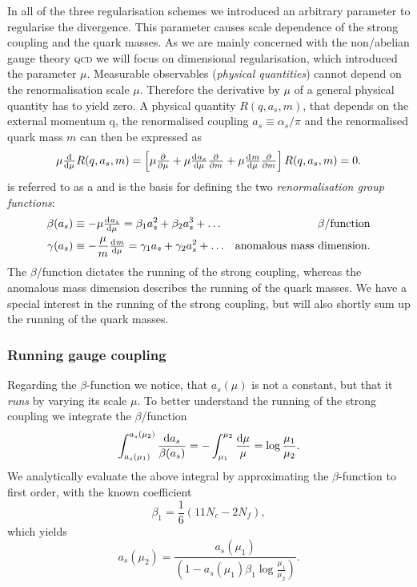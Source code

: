 \documentclass[../../index.tex]{subfiles}
\begin{document}
In all of the three regularisation schemes we introduced an arbitrary parameter
to regularise the divergence. This parameter causes scale dependence of the
strong coupling and the quark masses. As we are mainly concerned with the
non\-/abelian gauge theory \textsc{qcd} we will focus on dimensional
regularisation, which introduced the parameter \(\mu\). Measurable observables
(\textit{physical quantities}) cannot depend on the renormalisation scale
\(\mu\). Therefore the derivative by \(\mu\) of a general physical quantity has
to yield zero. A physical quantity \(R(q, a_s, m)\), that depends on the
external momentum q, the renormalised coupling \(a_s\equiv\alpha_s/\pi\) and the
renormalised quark mass \(m\) can then be expressed as
\begin{equation}
  \label{eq:RGE}
  \mu \od{}{\mu}R(q, a_s, m) = \left[ \mu \pd{}{\mu} + \mu \od{a_s}{\mu} \pd{}{m} + \mu \od{m}{\mu} \pd{}{m} \right] R(q, a_s, m) = 0.
\end{equation}
 is referred to as a 
and is the basis for defining the two \textit{renormalisation group functions}:
\begin{align}
  \beta(a_s) &\equiv -\mu \od{a_s}{\mu} = \beta_1 a_s^2 + \beta_2 a_s^3 + \dots & \beta\text{\-/function}
                                                                                  \label{eq:betaFunction} \\
  \gamma(a_s) &\equiv - \frac{\mu}{m} \od{m}{\mu} = \gamma_1 a_s + \gamma_2 a_s^2 + \dots & \text{anomalous mass dimension}.
                                                                                            \label{eq:anomalousMassDimension}
\end{align}
The \(\beta\)\-/function dictates the running of the strong coupling, whereas
the anomalous mass dimension describes the running of the quark masses. We have
a special interest in the running of the strong coupling, but will also shortly
sum up the running of the quark masses.

\subsubsection{Running gauge coupling}
Regarding the \(\beta\)-function we notice, that \(a_s(\mu)\) is not a constant,
but that it \textit{runs} by varying its scale \(\mu\). To better understand the
running of the strong coupling we integrate the \(\beta\)\-/function
\begin{equation}
  \int_{a_s(\mu_1)}^{a_s(\mu_2)}\frac{\dif a_s}{\beta(a_s)} = - \int_{\mu_1}^{\mu_2} \frac{\dif \mu}{\mu} = \log \frac{\mu_1}{\mu_2}.
\end{equation}
We analytically evaluate the above integral by approximating the
\(\beta\)-function to first order, with the known coefficient
\begin{equation}
  \label{eq:firstBetaCoefficient}
  \beta_1 = \frac{1}{6}(11 N_c - 2 N_f),
\end{equation}
which yields
\begin{equation}
  \label{eq:strongCouplingFirstOrder}
  a_s(\mu_2) = \frac{a_s(\mu_1)}{\left( 1 - a_s(\mu_1) \beta_1 \log\frac{\mu_1}{\mu_2} \right)}.
\end{equation}
\end{document}

